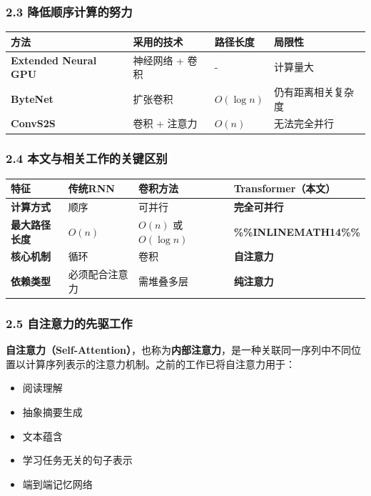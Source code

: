 \documentclass[11pt,a4paper]{article}
\begin{document}
\subsubsection*{2.3 降低顺序计算的努力}

\begin{center}
\begin{tabular}{|l|l|l|l|}
\hline
方法 & 采用的技术 & 路径长度 & 局限性 \\
\hline
\textbf{Extended Neural GPU} & 神经网络 + 卷积 & - & 计算量大 \\
\hline
\textbf{ByteNet} & 扩张卷积 & $O(\log n)$ & 仍有距离相关复杂度 \\
\hline
\textbf{ConvS2S} & 卷积 + 注意力 & $O(n)$ & 无法完全并行 \\
\hline
\end{tabular}
\end{center}

\subsubsection*{2.4 本文与相关工作的关键区别}

\begin{center}
\begin{tabular}{|l|l|l|l|}
\hline
特征 & 传统RNN & 卷积方法 & \textbf{Transformer（本文）} \\
\hline
\textbf{计算方式} & 顺序 & 可并行 & \textbf{完全可并行} \\
\hline
\textbf{最大路径长度} & $O(n)$ & $O(n)$ 或 $O(\log n)$ & \textbf{\%\%INLINEMATH14\%\%} \\
\hline
\textbf{核心机制} & 循环 & 卷积 & \textbf{自注意力} \\
\hline
\textbf{依赖类型} & 必须配合注意力 & 需堆叠多层 & \textbf{纯注意力} \\
\hline
\end{tabular}
\end{center}

\subsubsection*{2.5 自注意力的先驱工作}

\textbf{自注意力（Self-Attention）}，也称为\textbf{内部注意力}，是一种关联同一序列中不同位置以计算序列表示的注意力机制。之前的工作已将自注意力用于：

\begin{itemize}
  \item 阅读理解
  \item 抽象摘要生成
  \item 文本蕴含
  \item 学习任务无关的句子表示
  \item 端到端记忆网络
\end{itemize}
\end{document}

